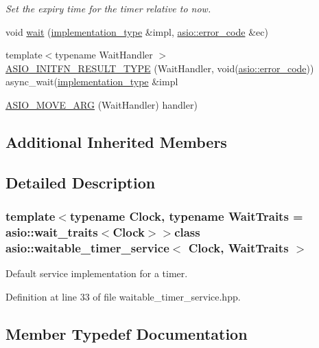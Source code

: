\begin{DoxyCompactItemize}
\begin{DoxyCompactList}\small\item\em Set the expiry time for the timer relative to now. \end{DoxyCompactList}\item 
void \hyperlink{classasio_1_1waitable__timer__service_a0c8d92e4c7e0d7183c66fb82fac34e36}{wait} (\hyperlink{classasio_1_1waitable__timer__service_a397aa07a3c8f707a307b83a9616ed44e}{implementation\+\_\+type} \&impl, \hyperlink{classasio_1_1error__code}{asio\+::error\+\_\+code} \&ec)
\item 
{\footnotesize template$<$typename Wait\+Handler $>$ }\\\hyperlink{classasio_1_1waitable__timer__service_a217ffb36215d01913041ea0cdbcbd679}{A\+S\+I\+O\+\_\+\+I\+N\+I\+T\+F\+N\+\_\+\+R\+E\+S\+U\+L\+T\+\_\+\+T\+Y\+P\+E} (Wait\+Handler, void(\hyperlink{classasio_1_1error__code}{asio\+::error\+\_\+code})) async\+\_\+wait(\hyperlink{classasio_1_1waitable__timer__service_a397aa07a3c8f707a307b83a9616ed44e}{implementation\+\_\+type} \&impl
\item 
\hyperlink{classasio_1_1waitable__timer__service_ad22f2af0648da8f77e45534ba9260090}{A\+S\+I\+O\+\_\+\+M\+O\+V\+E\+\_\+\+A\+R\+G} (Wait\+Handler) handler)
\end{DoxyCompactItemize}
\subsection*{Additional Inherited Members}


\subsection{Detailed Description}
\subsubsection*{template$<$typename Clock, typename Wait\+Traits = asio\+::wait\+\_\+traits$<$\+Clock$>$$>$class asio\+::waitable\+\_\+timer\+\_\+service$<$ Clock, Wait\+Traits $>$}

Default service implementation for a timer. 

Definition at line 33 of file waitable\+\_\+timer\+\_\+service.\+hpp.



\subsection{Member Typedef Documentation}
\hypertarget{classasio_1_1waitable__timer__service_a39c2c82bad766b47c23abf56738392e7}{}

